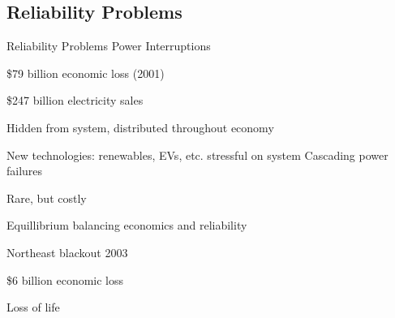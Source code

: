 \subsection{Reliability Problems}
\begin{frame}{Reliability Problems}
\alert{Power Interruptions}
\bi
\item \$79 billion economic loss (2001) 
\bi
\item \$247 billion electricity sales
\ei 
\item Hidden from system, distributed throughout economy
\item New technologies: renewables, EVs, etc. stressful on system
\ei
\pause
\alert{Cascading power failures}
\bi
\item Rare, but costly
\item Equillibrium balancing economics and reliability
\item Northeast blackout 2003
\bi
\item \$6 billion economic loss
\item Loss of life
\ei
\ei
\end{frame}